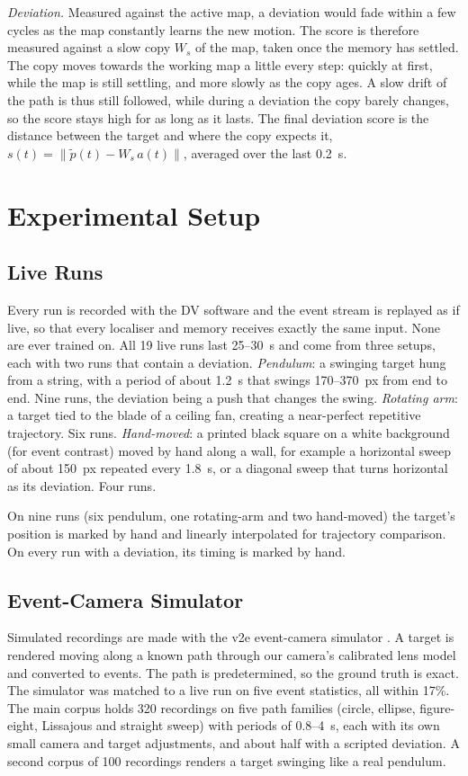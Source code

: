 \documentclass[conference]{IEEEtran}
\begin{document}
\emph{Deviation.} Measured against the active map, a deviation would fade within a few cycles as the map constantly learns the new motion. The score is therefore measured against a slow copy $W_s$ of the map, taken once the memory has settled. The copy moves towards the working map a little every step: quickly at first, while the map is still settling, and more slowly as the copy ages. A slow drift of the path is thus still followed, while during a deviation the copy barely changes, so the score stays high for as long as it lasts. The final deviation score is the distance between the target and where the copy expects it, $s(t) = \lVert \tilde{p}(t) - W_s\,a(t) \rVert$, averaged over the last 0.2~s.

\section{Experimental Setup}
\label{sec:setup}

\subsection{Live Runs}
\label{sec:runs}
Every run is recorded with the DV software and the event stream is replayed as if live, so that every localiser and memory receives exactly the same input. None are ever trained on. All 19 live runs last 25--30~s and come from three setups, each with two runs that contain a deviation. \emph{Pendulum}: a swinging target hung from a string, with a period of about 1.2~s that swings 170--370~px from end to end. Nine runs, the deviation being a push that changes the swing. \emph{Rotating arm}: a target tied to the blade of a ceiling fan, creating a near-perfect repetitive trajectory. Six runs. \emph{Hand-moved}: a printed black square on a white background (for event contrast) moved by hand along a wall, for example a horizontal sweep of about 150~px repeated every 1.8~s, or a diagonal sweep that turns horizontal as its deviation. Four runs.

On nine runs (six pendulum, one rotating-arm and two hand-moved) the target's position is marked by hand and linearly interpolated for trajectory comparison. On every run with a deviation, its timing is marked by hand.

\subsection{Event-Camera Simulator}
\label{sec:sim}
Simulated recordings are made with the v2e event-camera simulator \cite{Hu2021V2e}. A target is rendered moving along a known path through our camera's calibrated lens model and converted to events. The path is predetermined, so the ground truth is exact. The simulator was matched to a live run on five event statistics, all within 17\%. The main corpus holds 320 recordings on five path families (circle, ellipse, figure-eight, Lissajous and straight sweep) with periods of 0.8--4~s, each with its own small camera and target adjustments, and about half with a scripted deviation. A second corpus of 100 recordings renders a target swinging like a real pendulum.
\end{document}
